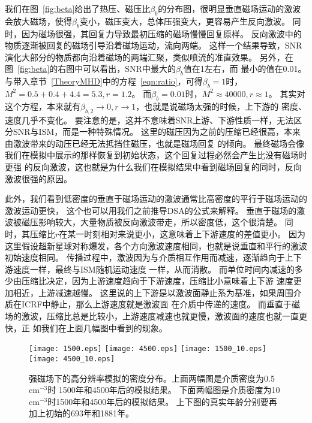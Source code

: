 我们在图~\ref{fig:beta}给出了热压、磁压比$\beta_b$的分布图，很明显垂直磁场运动的激波
会放大磁场，使得$\beta_b$变小，磁压变大，总体压强变大，更容易产生反向激波。
同时，因为磁场很强，其回复力导致最初压缩的磁场慢慢回复原样。
反向激波中的物质逐渐被回复的磁场引导沿着磁场运动，流向两端。
这样一个结果导致，SNR演化大部分的物质都向沿着磁场的两端汇聚，类似喷流的准直效果。
另外，在图~\ref{fig:beta}的右图中可以看出，SNR中最大的$\beta_b$值在1左右，而
最小的值在0.01。
与带入章节~\ref{TheoryMHD}中的方程~\ref{eqn:ratio}，可得$\beta_b=1$时，
$M^2=0.5+0.4+4.4=5.3, r=1.2$。
而$\beta_b=0.01$时，$M^2 \approx 40000, r \approx 1$。
其实对这个方程，本来就有$\beta_{b,2}\to 0, r \to 1$，也就是说磁场太强的时候，上下游的
密度、速度几乎不变化。
要注意的是，这并不意味着SNR上游、下游性质一样，无法区分SNR与ISM，而是一种特殊情况。
这里的磁压因为之前的压缩已经很高，本来由激波带来的动压已经无法抵挡住磁压，也就是磁场回复
的倾向。
最终磁场会像我们在模拟中展示的那样恢复到初始状态，这个回复过程必然会产生比没有磁场时更强
的反向激波，这也就是为什么我们在模拟结果中看到磁场回复的同时，反向激波很强的原因。

此外，我们看到低密度的垂直于磁场运动的激波通常比高密度的平行于磁场运动的激波运动更快，
这个也可以用我们之前推导DSA的公式来解释。
垂直于磁场的激波被磁压影响较大，大量物质被反向激波带走，所以密度低，这个很清楚。
同时，其压缩比$r$在某一时刻相对来说更小，这意味着上下游速度的差值更小。
因为这里假设超新星球对称爆发，各个方向激波速度相同，也就是说垂直和平行的激波初始速度相同。
传播过程中，激波因为与介质相互作用而减速，逐渐趋向于上下游速度一样，最终与ISM随机运动速度
一样，从而消散。
而单位时间内减速的多少由压缩比决定，因为上游速度趋向于下游速度，压缩比小意味着上下游
速度更加相近，上游减速越慢。
这里说的上下游是以激波面静止系为基准，如果周围介质在ICRF中静止，那么上游速度就是激波面
在介质中传递的速度。
而垂直于磁场的激波，压缩比总是比较小，上游速度减速也就更慢，激波面的速度也就一直更快，正
如我们在上面几幅图中看到的现象。


\begin{figure*}
    \centering
    \texttt{[image: 1500.eps]}
    \texttt{[image: 4500.eps]}\newline
    \texttt{[image: 1500\_10.eps]}
    \texttt{[image: 4500\_10.eps]}
    \caption{强磁场下的高分辨率模拟的密度分布。上面两幅图是介质密度为0.5 cm$^{-3}$时
    1500年和4500年后的模拟结果。
    下面两幅图是介质密度为10 cm$^{-3}$时1500年和4500年后的模拟结果。
    上下图的真实年龄分别要再加上初始的693年和1881年。}
\label{fig:gc}
\end{figure*}

